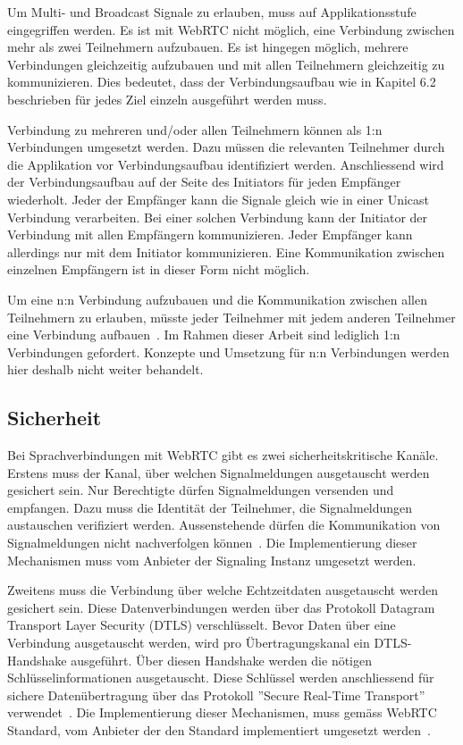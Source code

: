 Um Multi- und Broadcast Signale zu erlauben, muss auf Applikationsstufe eingegriffen werden.
Es ist mit WebRTC nicht möglich, eine Verbindung zwischen mehr als zwei Teilnehmern aufzubauen.
Es ist hingegen möglich, mehrere Verbindungen gleichzeitig aufzubauen und mit allen Teilnehmern gleichzeitig zu kommunizieren.
Dies bedeutet, dass der Verbindungsaufbau wie in Kapitel 6.2 beschrieben für jedes Ziel einzeln ausgeführt werden muss.

Verbindung zu mehreren und/oder allen Teilnehmern können als 1:n Verbindungen umgesetzt werden.
Dazu müssen die relevanten Teilnehmer durch die Applikation vor Verbindungsaufbau identifiziert werden.
Anschliessend wird der Verbindungsaufbau auf der Seite des Initiators für jeden Empfänger wiederholt.
Jeder der Empfänger kann die Signale gleich wie in einer Unicast Verbindung verarbeiten.
Bei einer solchen Verbindung kann der Initiator der Verbindung mit allen Empfängern kommunizieren.
Jeder Empfänger kann allerdings nur mit dem Initiator kommunizieren.
Eine Kommunikation zwischen einzelnen Empfängern ist in dieser Form nicht möglich.

Um eine n:n Verbindung aufzubauen und die Kommunikation zwischen allen Teilnehmern zu erlauben, müsste jeder Teilnehmer mit jedem anderen Teilnehmer eine Verbindung aufbauen~\cite{webrtc_mesh}.
Im Rahmen dieser Arbeit sind lediglich 1:n Verbindungen gefordert.
Konzepte und Umsetzung für n:n Verbindungen werden hier deshalb nicht weiter behandelt.

\subsection{Sicherheit}

Bei Sprachverbindungen mit WebRTC gibt es zwei sicherheitskritische Kanäle.
Erstens muss der Kanal, über welchen Signalmeldungen ausgetauscht werden gesichert sein.
Nur Berechtigte dürfen Signalmeldungen versenden und empfangen.
Dazu muss die Identität der Teilnehmer, die Signalmeldungen austauschen verifiziert werden.
Aussenstehende dürfen die Kommunikation von Signalmeldungen nicht nachverfolgen können~\cite{rfc_8827_webRTC_SecurityArchitecture}.
Die Implementierung dieser Mechanismen muss vom Anbieter der Signaling Instanz umgesetzt werden.

Zweitens muss die Verbindung über welche Echtzeitdaten ausgetauscht werden gesichert sein.
Diese Datenverbindungen werden über das Protokoll Datagram Transport Layer Security (DTLS) verschlüsselt.
Bevor Daten über eine Verbindung ausgetauscht werden, wird pro Übertragungskanal ein DTLS-Handshake ausgeführt.
Über diesen Handshake werden die nötigen Schlüsselinformationen ausgetauscht.
Diese Schlüssel werden anschliessend für sichere Datenübertragung über das Protokoll ''Secure Real-Time Transport'' verwendet~\cite{rfc_8827_webRTC_SecurityArchitecture}.
Die Implementierung dieser Mechanismen, muss gemäss WebRTC Standard, vom Anbieter der den Standard implementiert umgesetzt werden~\cite{webrtc_spec}.

\clearpage
